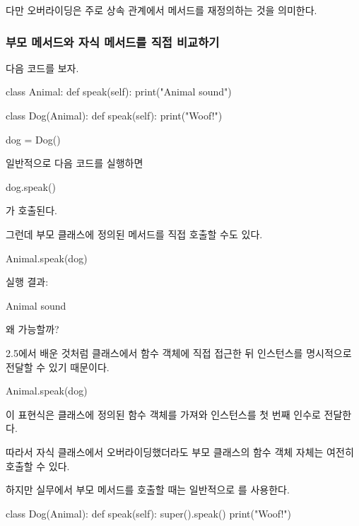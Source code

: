 다만 오버라이딩은 주로 상속 관계에서 메서드를 재정의하는 것을 의미한다.

\subsubsection{부모 메서드와 자식 메서드를 직접 비교하기}

다음 코드를 보자.

\begin{dhkcode}
class Animal:
    def speak(self):
        print("Animal sound")


class Dog(Animal):
    def speak(self):
        print("Woof!")


dog = Dog()
\end{dhkcode}

일반적으로 다음 코드를 실행하면

\begin{dhkcode}
dog.speak()
\end{dhkcode}

가 호출된다.

그런데 부모 클래스에 정의된 메서드를 직접 호출할 수도 있다.

\begin{dhkcode}
Animal.speak(dog)
\end{dhkcode}

실행 결과:

\begin{dhkzsh}
Animal sound
\end{dhkzsh}

왜 가능할까?

2.5에서 배운 것처럼 클래스에서 함수 객체에 직접 접근한 뒤 인스턴스를 명시적으로 전달할 수 있기 때문이다.

\begin{dhkcode}
Animal.speak(dog)
\end{dhkcode}

이 표현식은  클래스에 정의된 함수 객체를 가져와  인스턴스를 첫 번째 인수로 전달한다.

따라서 자식 클래스에서 오버라이딩했더라도 부모 클래스의 함수 객체 자체는 여전히 호출할 수 있다.

하지만 실무에서 부모 메서드를 호출할 때는 일반적으로 를 사용한다.

\begin{dhkcode}
class Dog(Animal):
    def speak(self):
        super().speak()
        print("Woof!")
\end{dhkcode}

